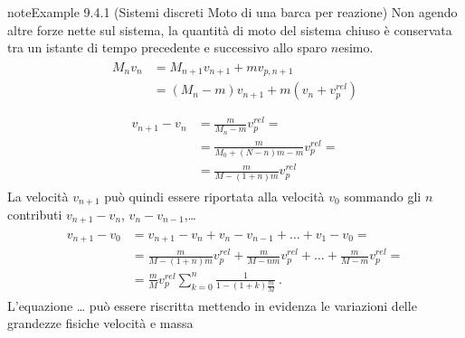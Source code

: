 \documentclass[letterpaper,10pt,italian]{jupyterBook}
\begin{document}
\begin{sphinxadmonition}{note}{Example 9.4.1 (Sistemi discreti \sphinxhyphen{} Moto di una barca per reazione)}
\sphinxAtStartPar
Non agendo altre forze nette sul sistema, la quantità di moto del sistema chiuso è conservata tra un istante di tempo precedente e successivo allo sparo \(n\)\sphinxhyphen{}esimo.
\begin{equation*}
\begin{split}\begin{aligned}
  M_{n} v_{n} 
  & = M_{n+1} v_{n+1} + m v_{p,n+1} \\
  & = ( M_{n} - m ) v_{n+1} + m ( v_{n} + v_p^{rel} ) \\
\end{aligned}\end{split}
\end{equation*}\begin{equation*}
\begin{split}\begin{aligned}
  v_{n+1} - v_n & = \frac{m}{M_n - m} v_p^{rel} = \\
  & = \frac{m}{M_0 + (N-n)m - m} v_p^{rel} = \\
  & = \frac{m}{M - (1+n) m} v_p^{rel}
\end{aligned}\end{split}
\end{equation*}
\sphinxAtStartPar
La velocità \(v_{n+1}\) può quindi essere riportata alla velocità \(v_0\) sommando gli \(n\) contributi \(v_{n+1} - v_{n}\), \(v_{n} - v_{n-1}\),…
\begin{equation*}
\begin{split}\begin{aligned}
  v_{n+1} - v_0 & = v_{n+1} - v_n + v_n - v_{n-1} + \dots + v_1 - v_0 = \\
  & = \frac{m}{M - (1+n) m} v_p^{rel} +  \frac{m}{M - n m} v_p^{rel} + \dots + \frac{m}{M-m} v^{rel}_p = \\
  & = \frac{m}{M} v_p^{rel} \sum_{k = 0}^{n} \frac{1}{1 - (1+k) \frac{m}{M}} \ .
\end{aligned}\end{split}
\end{equation*}
\sphinxAtStartPar
{} L’equazione … può essere riscritta mettendo in evidenza le variazioni delle grandezze fisiche velocità e massa


\end{sphinxadmonition}
\end{document}

